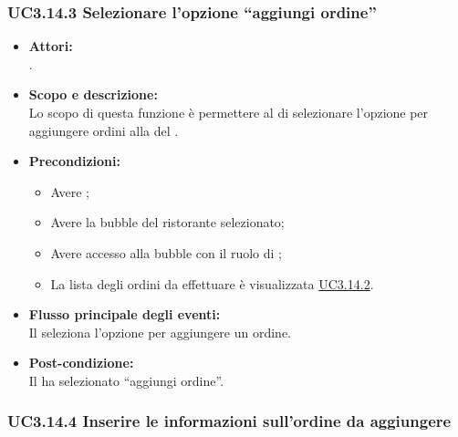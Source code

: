 \subsubsection{UC3.14.3 Selezionare l’opzione “aggiungi ordine”} \label{UC3.14.3}

\begin{itemize}
	\item \textbf{Attori:}
	\\.
	\item \textbf{Scopo e descrizione:} 
	\\Lo scopo di questa funzione è permettere al  di selezionare l’opzione per aggiungere ordini alla  del .
	\item \textbf{Precondizioni:}
	\begin{itemize}
		\item Avere ;
		\item Avere la bubble del ristorante selezionato;
		\item Avere accesso alla bubble con il ruolo di ;
		\item La lista degli ordini da effettuare è visualizzata \hyperref[UC3.14.2]{UC3.14.2}.
	\end{itemize}
	\item \textbf{Flusso principale degli eventi:}
	\\Il {} seleziona l’opzione per aggiungere un ordine.
	\item \textbf{Post-condizione:}
	\\Il {} ha selezionato “aggiungi ordine”.
\end{itemize}

\subsubsection{UC3.14.4 Inserire le informazioni sull’ordine da aggiungere} \label{UC3.14.4}

